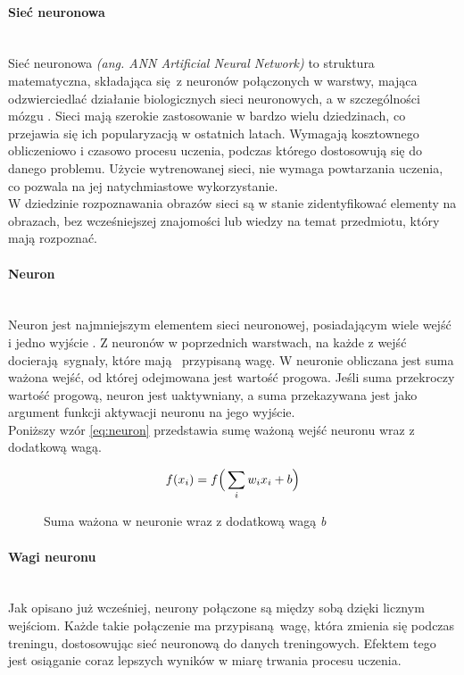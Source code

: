 \paragraph{Sieć neuronowa} \mbox{}\\
Sieć neuronowa \textit{(ang. ANN Artificial Neural Network)} to struktura matematyczna,
składająca się z neuronów połączonych w warstwy, mająca odzwierciedlać działanie
biologicznych sieci neuronowych, a w szczególności mózgu \cite{intuitiveExplanation, WIKIcnn}.
Sieci mają szerokie zastosowanie w bardzo wielu dziedzinach, co przejawia się ich
popularyzacją w ostatnich latach. Wymagają kosztownego obliczeniowo i czasowo
procesu uczenia, podczas którego dostosowują się do danego problemu. Użycie wytrenowanej
sieci, nie wymaga powtarzania uczenia, co pozwala na jej natychmiastowe wykorzystanie.\\
W dziedzinie rozpoznawania obrazów sieci są w stanie zidentyfikować elementy na obrazach,
bez wcześniejszej znajomości lub wiedzy na temat przedmiotu, który mają rozpoznać.

\paragraph{Neuron} \mbox{}\\
Neuron jest najmniejszym elementem sieci neuronowej, posiadającym wiele wejść i jedno wyjście \cite{CS231n_activ, NNbiology, NeuronAnimation}.
Z neuronów w poprzednich warstwach, na każde z wejść docierają sygnały, które mają 
przypisaną wagę. W neuronie obliczana jest suma ważona wejść, od której odejmowana jest
wartość progowa. Jeśli suma przekroczy wartość progową, neuron jest uaktywniany, a suma
przekazywana jest jako argument funkcji aktywacji neuronu na jego wyjście.\\
Poniższy wzór \ref{eq:neuron} przedstawia sumę ważoną wejść neuronu wraz z dodatkową wagą.
\begin{figure}[h!]
\renewcommand{\figurename}{Wzór}%
\begin{equation} \label{eq:neuron}
f(x_{i}) = f\Big(\sum_{i}w_{i}x_{i} + b \Big)\\
\end{equation}
\caption{Suma ważona w neuronie wraz z dodatkową wagą \textit{b}}
\end{figure}

\paragraph{Wagi neuronu} \mbox{}\\
Jak opisano już wcześniej, neurony połączone są między sobą dzięki licznym wejściom.
Każde takie połączenie ma przypisaną wagę, która zmienia się podczas treningu,
dostosowując sieć neuronową do danych treningowych. Efektem tego jest osiąganie
coraz lepszych wyników w miarę trwania procesu uczenia.

